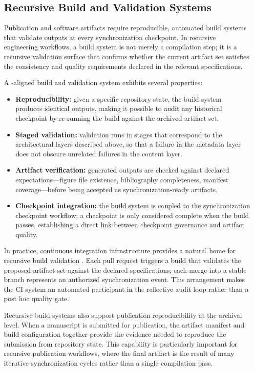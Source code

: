 \subsection{Recursive Build and Validation Systems}

Publication and software artifacts require reproducible, automated build systems that validate outputs at every synchronization checkpoint. In recursive engineering workflows, a build system is not merely a compilation step; it is a recursive validation surface that confirms whether the current artifact set satisfies the consistency and quality requirements declared in the relevant specifications.

A -aligned build and validation system exhibits several properties:
\begin{itemize}
  \item \textbf{Reproducibility:} given a specific repository state, the build system produces identical outputs, making it possible to audit any historical checkpoint by re-running the build against the archived artifact set.
  \item \textbf{Staged validation:} validation runs in stages that correspond to the architectural layers described above, so that a failure in the metadata layer does not obscure unrelated failures in the content layer.
  \item \textbf{Artifact verification:} generated outputs are checked against declared expectations---figure file existence, bibliography completeness, manifest coverage---before being accepted as synchronization-ready artifacts.
  \item \textbf{Checkpoint integration:} the build system is coupled to the synchronization checkpoint workflow; a checkpoint is only considered complete when the build passes, establishing a direct link between checkpoint governance and artifact quality.
\end{itemize}

In practice, continuous integration infrastructure provides a natural home for recursive build validation \cite{Jimenez2024SWEBench}. Each pull request triggers a build that validates the proposed artifact set against the declared specifications; each merge into a stable branch represents an authorized synchronization event. This arrangement makes the CI system an automated participant in the reflective audit loop rather than a post hoc quality gate.

Recursive build systems also support publication reproducibility at the archival level. When a manuscript is submitted for publication, the artifact manifest and build configuration together provide the evidence needed to reproduce the submission from repository state. This capability is particularly important for recursive publication workflows, where the final artifact is the result of many iterative synchronization cycles rather than a single compilation pass.

